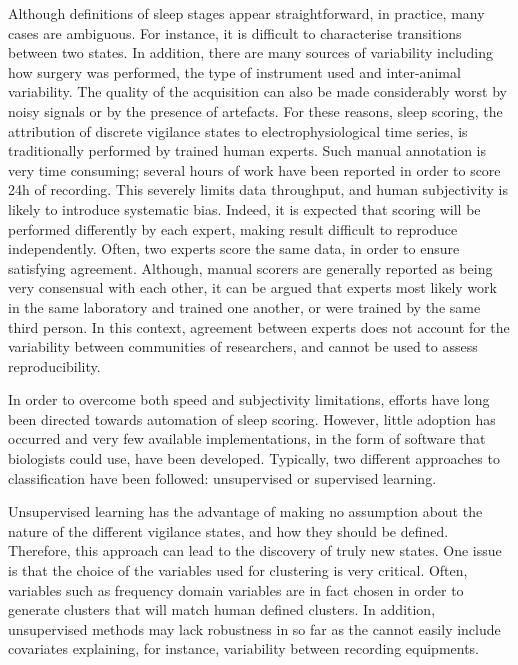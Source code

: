 Although definitions of sleep stages appear straightforward, in practice, many cases are ambiguous.
For instance, it is difficult to characterise transitions between two states.
In addition, there are many sources of variability including how surgery was performed, the type of instrument used and inter-animal variability.
The quality of the acquisition can also be made considerably worst by noisy signals or by the presence of artefacts.
For these reasons, sleep scoring, \ie{} the attribution of discrete vigilance states to electrophysiological time series,
is traditionally performed by trained human experts.
Such manual annotation is very time consuming; several hours of work have been reported in order to score 24h of recording.
This severely limits data throughput, and human subjectivity is likely to introduce systematic bias.
Indeed, it is expected that scoring will be performed differently by each expert, making result difficult to reproduce independently.
Often, two experts score the same data, in order to ensure satisfying agreement.
Although, manual scorers are generally reported as being very consensual with
each other\cite{costa-miserachs_automated_2003,sen_comparative_2014}, it can be
argued that experts most likely work in the same laboratory and trained one another, or were trained by the same third person.
In this context, agreement between experts does not account for the variability between communities of researchers, and cannot be used to assess reproducibility.

In order to overcome both speed and subjectivity limitations, efforts have long
been directed towards automation of sleep
scoring\cite{chouvet_automatic_1980, haustein_automatic_1986}.
However, little adoption has occurred and very few available implementations, in the form of software that biologists could use, have been developed.
Typically, two different approaches to classification have been followed: unsupervised or supervised learning.

Unsupervised learning \cite{langkvist_sleep_2012,sunagawa_faster:_2013} has the
advantage of making no assumption about the nature of the different vigilance states, and how they should be defined.
Therefore, this approach can lead to the discovery of truly new states.
One issue is that the choice of the variables used for clustering is very
critical.
Often, variables such as frequency domain variables are in fact chosen in order
to generate clusters that will match human defined clusters.
In addition, unsupervised methods may lack robustness\cite{sunagawa_faster:_2013} in so far as the
cannot easily include covariates explaining, for instance, variability between recording equipments.

